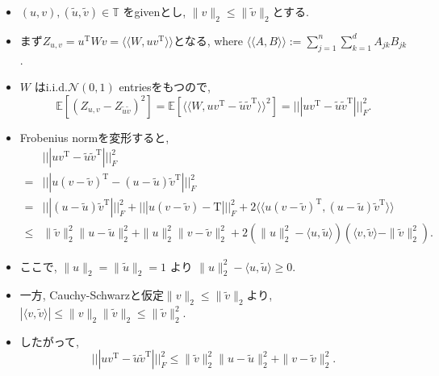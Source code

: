 \documentclass[unicode,aspectratio=169,11pt]{beamer}
\newcommand{\ex}{\mathbb{E}}
\newcommand{\bb}{\mathbb}
\newcommand{\cc}{\mathcal}
\newcommand{\tr}{\mathrm{T}}
\begin{document}
\begin{frame}
  \begin{itemize}
    \item $(u, v), (\tilde{u}, \tilde{v}) \in \bb{T}$ をgivenとし, $\|v\|_2 \le \|\tilde{v}\|_2$とする.
    \item まず$Z_{u,v} =u^\tr W v= \langle\langle W, uv^\tr \rangle\rangle$となる, where $\langle\langle A,B\rangle\rangle := \sum_{j=1}^n\sum_{k=1}^dA_{jk}B_{jk}$.
    \item $W$ はi.i.d.$\cc{N}(0,1)$ entriesをもつので,
          \[
            \ex\left[(Z_{u,v} - Z_{\tilde{u}\tilde{v}})^2\right]
            = \ex \left[\langle\langle W, uv^\tr-\tilde{u}\tilde{v}^\tr\rangle\rangle^2\right]
            = |||uv^\tr - \tilde{u}\tilde{v}^\tr |||^2_F.
          \]
    \item Frobenius normを変形すると,
          \begin{align*}
             &|||uv^\tr - \tilde{u}\tilde{v}^\tr |||^2_F\\
            =&|||u(v - \tilde{v})^\tr - (u-\tilde{u})\tilde{v}^\tr |||^2_F \\
            =&|||(u-\tilde{u})\tilde{v}^\tr|||^2_F + |||u(v-\tilde{v})-\tr|||^2_F + 2\langle\langle u(v-\tilde{v})^\tr, (u-\tilde{u})\tilde{v}^\tr\rangle\rangle\\
            \le& \|\tilde{v}\|_2^2\|u-\tilde{u}\|_2^2 + \|u\|_2^2\|v-\tilde{v}\|_2^2 + 2(\|u\|_2^2-\langle u,\tilde{u}\rangle)(\langle v,\tilde{v}\rangle-\|\tilde{v}\|_2^2).
          \end{align*}
    \item ここで, $\|u\|_2 = \|\tilde{u}\|_2 = 1$ より $\|u\|_2^2 - \langle u, \tilde{u}\rangle \ge 0$.
    \item 一方, Cauchy-Schwarzと仮定$\|v\|_2 \le \|\tilde{v}\|_2$より, $|\langle v, \tilde{v}\rangle| \le \|v\|_2 \|\tilde{v}\|_2 \le \|\tilde{v}\|_2^2$.
    \item したがって, 
          \[|||uv^\tr - \tilde{u}\tilde{v}^\tr |||^2_F \le  \|\tilde{v}\|_2^2\|u-\tilde{u}\|_2^2 + \|v-\tilde{v}\|_2^2.\]
  \end{itemize}
\end{frame}
\end{document}
